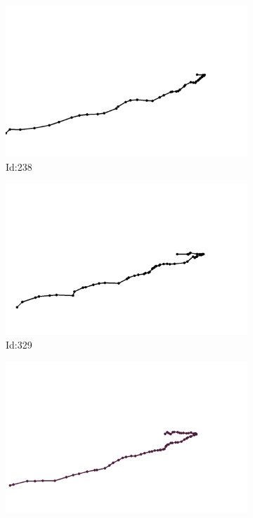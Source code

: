 \documentclass[12pt,twoside]{report}
\begin{document}
\begin{figure}
\centering
\begin{subfigure}[b]{0.20\textwidth}
\centering
\includegraphics[width=\textwidth]{../../trajectories/238.png}
\caption{Id:238}
\end{subfigure}
\begin{subfigure}[b]{0.20\textwidth}
\centering
\includegraphics[width=\textwidth]{../../trajectories/329.png}
\caption{Id:329}
\end{subfigure}
\begin{subfigure}[b]{0.20\textwidth}
\centering
\includegraphics[width=\textwidth]{../../trajectories/330.png}

\end{subfigure}
\end{figure}
\end{document}
